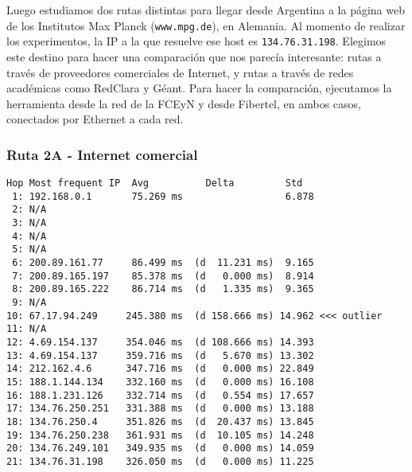 Luego estudiamos dos rutas distintas para llegar desde Argentina a la página web de los Institutos Max Planck (\texttt{www.mpg.de}), en Alemania. Al momento de realizar los experimentos, la IP a la que resuelve ese host es \texttt{134.76.31.198}. Elegimos este destino para hacer una comparación que nos parecía interesante: rutas a través de proveedores comerciales de Internet, y rutas a través de redes académicas como RedClara y Géant. Para hacer la comparación, ejecutamos la herramienta desde la red de la FCEyN y desde Fibertel, en ambos casos, conectados por Ethernet a cada red.

\subsubsection{Ruta 2A - Internet comercial}




\begin{Verbatim}[fontsize=\small]
 Hop Most frequent IP  Avg          Delta         Std
 1: 192.168.0.1       75.269 ms                  6.878 
 2: N/A            
 3: N/A            
 4: N/A            
 5: N/A            
 6: 200.89.161.77     86.499 ms  (d  11.231 ms)  9.165 
 7: 200.89.165.197    85.378 ms  (d   0.000 ms)  8.914 
 8: 200.89.165.222    86.714 ms  (d   1.335 ms)  9.365 
 9: N/A            
10: 67.17.94.249     245.380 ms  (d 158.666 ms) 14.962 <<< outlier
11: N/A            
12: 4.69.154.137     354.046 ms  (d 108.666 ms) 14.393 
13: 4.69.154.137     359.716 ms  (d   5.670 ms) 13.302 
14: 212.162.4.6      347.716 ms  (d   0.000 ms) 22.849 
15: 188.1.144.134    332.160 ms  (d   0.000 ms) 16.108 
16: 188.1.231.126    332.714 ms  (d   0.554 ms) 17.657 
17: 134.76.250.251   331.388 ms  (d   0.000 ms) 13.188 
18: 134.76.250.4     351.826 ms  (d  20.437 ms) 13.845 
19: 134.76.250.238   361.931 ms  (d  10.105 ms) 14.248 
20: 134.76.249.101   349.935 ms  (d   0.000 ms) 14.059 
21: 134.76.31.198    326.050 ms  (d   0.000 ms) 11.225
\end{Verbatim}


